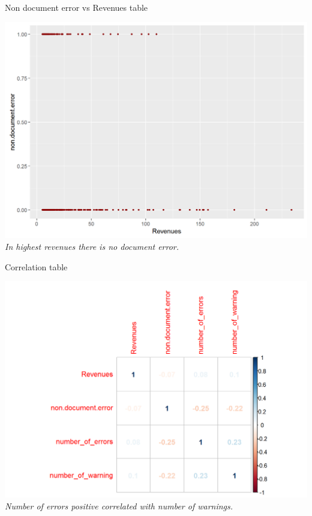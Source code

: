 \documentclass{article}
\begin{document}
\begin{table}[H]
\centering
\caption{Non document error vs Revenues table}
\begin{center}
\includegraphics[scale=0.5]{../R/photos/49_nde_rev.png}    \\
\textit{In highest revenues there is no document error.}
\end{center}
\end{table}
\begin{table}[H]
\centering
\caption{Correlation table}
\begin{center}
\includegraphics[scale=0.5]{../R/photos/51_html_cor.png}    \\
\textit{Number of errors positive correlated with number of warnings.}
\end{center}
\end{table}
\end{document}
